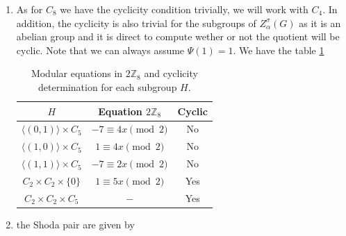 \documentclass{article}
\begin{document}
\begin{enumerate}
    \item As for $C_8$ we have the cyclicity condition trivially, we will work with $C_4$. In addition, the cyclicity is also trivial for the subgroups of $Z_\alpha^\sigma(G)$ as it is an abelian group and it is direct to compute wether or not the quotient will be cyclic. Note that we can always assume $\Psi(1)=1$. We have the table \ref{table6}
\begin{table}
\caption{Modular equations in $2\mathbb{Z}_8$ and cyclicity determination for each subgroup $H$.}\label{table6}
\begin{tabular}{ccc}
\toprule
$H$ & Equation $2\mathbb{Z}_8$ & Cyclic \\ %
\midrule
$\langle (0,1) \rangle \times C_5$ & $-7 \equiv 4x \pmod{2}$ & No \\
$\langle (1,0) \rangle \times C_5$ & $1 \equiv 4x \pmod{2}$  & No \\
$\langle (1,1) \rangle \times C_5$ & $-7 \equiv 2x \pmod{2}$ & No \\
$C_2 \times C_2 \times \{0\}$      & $1 \equiv 5x \pmod{2}$  & Yes \\
$C_2 \times C_2 \times C_5$        & $-$                     & Yes \\
\bottomrule
\end{tabular}
\end{table}

    \item the Shoda pair are given by


\end{enumerate}
\end{document}
